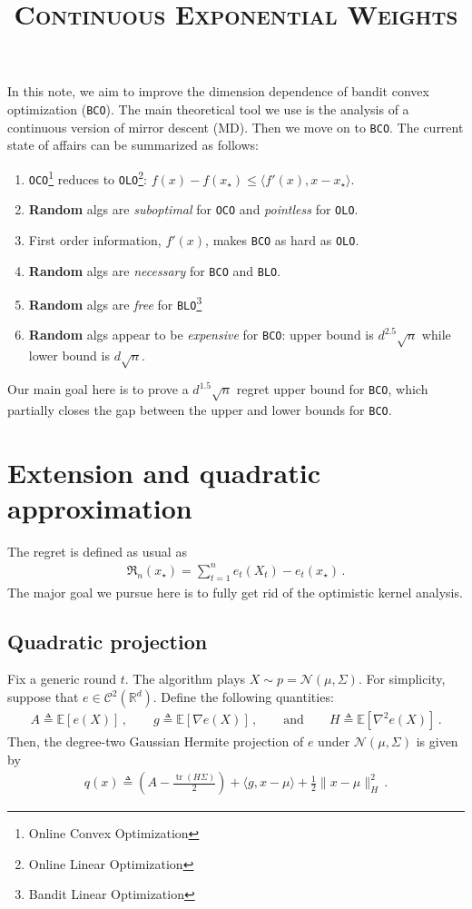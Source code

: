 \documentclass{article}
\title{\textsc{Continuous Exponential Weights}}
\date{}
\theoremstyle{plain}
\theoremstyle{definition}
\theoremstyle{plain}
\newcommand{\tr}{\operatorname{tr}}
\newcommand{\Rd}{\mathbb{R}^d}
\newcommand{\Reg}{\mathfrak{R}}
\newcommand{\E}{\mathbb E}
\newcommand{\cN}{\mathcal N}
\newcommand{\cC}{\mathcal C}
\newcommand{\mdalg}{\textsf{MD}\xspace}
\newcommand{\olo}{\texttt{OLO}\xspace}
\newcommand{\bco}{\texttt{BCO}\xspace}
\newcommand{\oco}{\texttt{OCO}\xspace}
\begin{document}
\maketitle

In this note, we aim to improve the dimension dependence of bandit convex optimization (\bco).
The main theoretical tool we use is the analysis of a continuous version of mirror descent (\mdalg).
Then we move on to \bco.
The current state of affairs can be summarized as follows:
\begin{enumerate}
    \item \oco\footnote{Online Convex Optimization} reduces to \olo\footnote{Online Linear Optimization}: $f(x) - f(x_\star) \leq \langle f'(x), x - x_\star \rangle$.
    \item \textbf{Random} algs are \textit{suboptimal} for \texttt{OCO} and \textit{pointless} for \texttt{OLO}.
    \item First order information, $f'(x)$, makes \texttt{BCO} as hard as \texttt{OLO}.
    \item \textbf{Random} algs are \textit{necessary} for \texttt{BCO} and \texttt{BLO}.
    \item \textbf{Random} algs are \textit{free} for \texttt{BLO}\footnote{Bandit Linear Optimization}
    \item \textbf{Random} algs appear to be \textit{expensive} for \texttt{BCO}: upper bound is $d^{2.5}\sqrt{n}$ while lower bound is $d\sqrt{n}$.
\end{enumerate}
Our main goal here is to prove a $d^{1.5} \sqrt{n}$ regret upper bound for \bco,
which partially closes the gap between the upper and lower bounds for \bco.

\newpage
\tableofcontents
\newpage

\section{Extension and quadratic approximation}
The regret is defined as usual as
\begin{align}
    \Reg_n(x_\star) = \sum_{t=1}^n e_t(X_t) - e_t(x_\star)\,.
\end{align}
The major goal we pursue here is to fully get rid of the optimistic kernel analysis.

\subsection{Quadratic projection}
Fix a generic round $t$.
The algorithm plays $X \sim p = \cN(\mu, \Sigma)$.
For simplicity, suppose that $e \in \cC^2(\Rd)$.
Define the following quantities:
\begin{align}
    A \triangleq \E[e(X)]\,, \qquad
    g \triangleq \E\left[\nabla e(X)\right]\,, \qquad\text{and}\qquad
    H \triangleq \E\left[\nabla^2 e(X)\right]\,.
\end{align}
Then, the degree-two Gaussian Hermite projection of $e$ under $\cN(\mu, \Sigma)$ is given by
\begin{align}
    q(x) \triangleq \left(A - \frac{\tr(H\Sigma)}{2}\right) + \langle g, x-\mu\rangle + \frac{1}{2}\|x-\mu\|^2_{H}\,.
\end{align}
\end{document}
